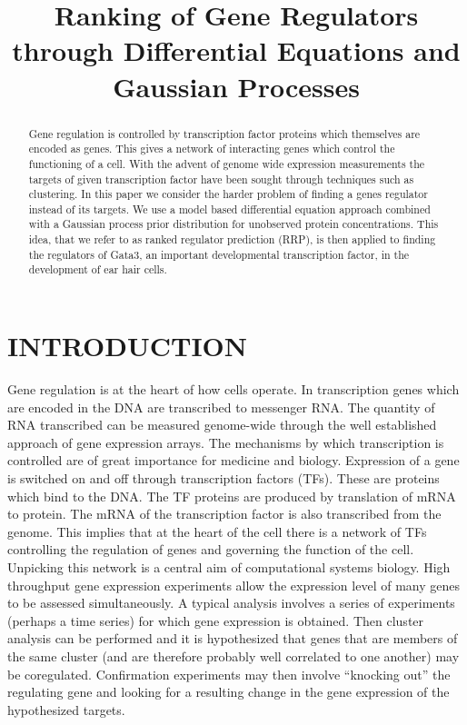 \documentclass{article}
\title{Ranking of Gene Regulators through Differential Equations and Gaussian Processes}
\begin{document}
\maketitle

\begin{abstract}
  Gene regulation is controlled by transcription factor proteins which
  themselves are encoded as genes. This gives a network of interacting
  genes which  control the functioning of  a cell. With  the advent of
  genome   wide   expression  measurements   the   targets  of   given
  transcription  factor have  been sought  through techniques  such as
  clustering. In this paper we  consider the harder problem of finding
  a  genes regulator instead  of its  targets.  We  use a  model based
  differential  equation  approach combined  with  a Gaussian  process
  prior distribution for unobserved protein concentrations. This idea,
  that  we refer  to as  ranked  regulator prediction  (RRP), is  then
  applied   to  finding   the  regulators   of  Gata3,   an  important
  developmental transcription  factor, in the development  of ear hair
  cells.
\end{abstract}

\sloppy

\section{INTRODUCTION}

Gene regulation is at the heart of how cells operate. In transcription
genes  which are  encoded in  the  DNA are  transcribed to  messenger
RNA.  The  quantity of  RNA  transcribed  can  be measured  genome-wide
through the  well established approach of gene  expression arrays. The
mechanisms  by   which  transcription  is  controlled   are  of  great
importance for medicine and biology.  Expression of a gene is switched
on  and off through  transcription factors  (TFs). These  are proteins
which bind to the DNA. The  TF proteins are produced by translation of
mRNA  to  protein.  The  mRNA  of the  transcription  factor  is  also
transcribed from  the genome.  This implies that  at the heart  of the
cell there is a network of TFs controlling the regulation of genes and
governing  the function  of  the  cell. Unpicking  this  network is  a
central  aim of  computational systems  biology. High  throughput gene
expression experiments allow the expression  level of many genes to be
assessed  simultaneously.  A typical  analysis  involves  a series  of
experiments  (perhaps a  time  series) for  which  gene expression  is
obtained.  Then   cluster  analysis  can   be  performed  and   it  is
hypothesized that genes that are  members of the same cluster (and are
therefore   probably  well   correlated   to  one   another)  may   be
coregulated.  Confirmation  experiments  may then  involve  ``knocking
out'' the  regulating gene and looking  for a resulting  change in the
gene expression of the hypothesized targets.
\end{document}
